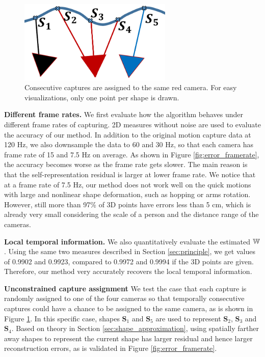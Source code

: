 \begin{figure}
\centering
\includegraphics[width=0.65\textwidth]{chapter5/resource/unconstrained_assignment_cropped.pdf}
\caption{Consecutive captures are assigned to the same red camera. For easy visualizations, only one point per shape is drawn.}
\label{fig:unconstrained_assign}
\end{figure}

\textbf{Different frame rates.}
We first evaluate how the algorithm behaves under different frame rates of capturing.
2D measures without noise are used to evaluate the accuracy of our method. In addition to the original motion capture data at 120 Hz, we also downsample the data to 60 and 30 Hz, so that each camera has frame rate of 15 and 7.5 Hz on average. As shown in Figure \ref{fig:error_framerate}, the accuracy becomes worse as the frame rate gets slower. 
The main reason is that the self-representation residual is larger at lower frame rate. We notice that at a frame rate of 7.5 Hz, our method does not work well on the quick motions with large and nonlinear shape deformation, such as hopping or arms rotation. However, still  more than 97\% of 3D points have errors less than 5 cm, which is already very small considering the scale of a person and the distance range of the cameras.

\textbf{Local temporal information.}
We also quantitatively evaluate the estimated $\mathbb W$. Using the same two measures described in Section \ref{sec:principle}, 
we get values of 0.9902 and 0.9923, compared to 0.9972 and 0.9994 if the 3D points are given. Therefore, our method very accurately recovers the local temporal information.

\textbf{Unconstrained capture assignment}
We test the case that each capture is randomly assigned to one of the four cameras so that temporally consecutive captures could have a chance to be assigned to the same camera, as is shown in Figure \ref{fig:unconstrained_assign}. In this specific case, shapes $\mathbf{S}_1$ and $\mathbf{S}_5$ are used to represent $\mathbf{S}_2$, $\mathbf{S}_3$ and $\mathbf{S}_4$. Based on theory in Section \ref{sec:shape_approximation}, using spatially farther away shapes to represent the current shape has larger residual and hence larger reconstruction errors, as is validated in Figure \ref{fig:error_framerate}.
 
